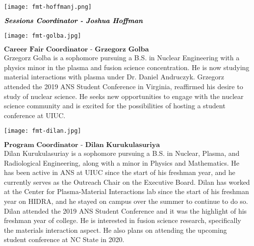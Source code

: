 \begin{minipage}{0.25\textwidth}
	\centering
	\texttt{[image: fmt-hoffmanj.png]}
\end{minipage}
\begin{minipage}{0.73\textwidth}
$\textbf{\textit{Sessions Coordinator - Joshua Hoffman}}$\\

\end{minipage}

\begin{minipage}{0.25\textwidth}
	\centering
	\texttt{[image: fmt-golba.jpg]}
\end{minipage}
\begin{minipage}{0.73\textwidth}
$\textbf{Career Fair Coordinator - Grzegorz Golba}$\\
	Grzegorz Golba is a sophomore pursuing a B.S. in Nuclear Engineering with a physics minor in the plasma and fusion science concentration. He is now studying material interactions with plasma under Dr. Daniel Andruczyk. Grzegorz attended the 2019 ANS Student Conference in Virginia, reaffirmed his desire to study of nuclear science. He seeks new opportunities to engage with the nuclear science community and is excited for the possibilities of hosting a student conference at UIUC.
\end{minipage}

\begin{minipage}{0.25\textwidth}
	\centering
	\texttt{[image: fmt-dilan.jpg]}
\end{minipage}
\begin{minipage}{0.73\textwidth}
	$\textbf{Program Coordinator - Dilan Kurukulasuriya}$\\
Dilan Kurukulasuriay is a sophomore pursuing a B.S. in Nuclear, Plasma, and Radiological Engineering, along with a minor in Physics and Mathematics. He has been active in ANS at UIUC since the start of his freshman year, and he currently serves as the Outreach Chair on the Executive Board. Dilan has worked at the Center for Plasma-Material Interactions lab since the start of his freshman year on HIDRA, and he stayed on campus over the summer to continue to do so. Dilan attended the 2019 ANS Student Conference and it was the highlight of his freshman year of college. He is interested in fusion science research, specifically the materials interaction aspect. He also plans on attending the upcoming student conference at NC State in 2020.
\end{minipage}

